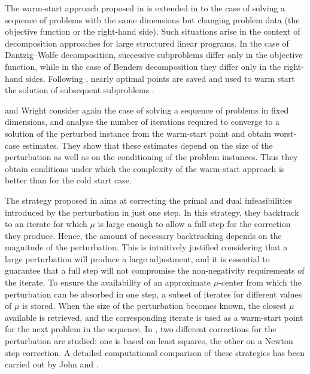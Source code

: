 The warm-start approach proposed in \cite{Gondzio98} is extended
in \cite{GondzioVial} to the case of solving a sequence of problems 
with the same dimensions but changing problem data (the objective 
function or the right-hand side). Such situations arise 
in the context of decomposition approaches for large structured 
linear programs. 
In the case of Dantzig--Wolfe decomposition, successive subproblems 
differ only in the objective function, while in the case 
of Benders decomposition they differ only in the right-hand sides.
Following \cite{Gondzio98}, nearly optimal points are saved and used 
to warm start the solution of subsequent subproblems \cite{GondzioVial}.


\yildirim and Wright \cite{YildirimWright} consider again the case 
of solving a sequence of problems in fixed dimensions, and
analyse the number of iterations required to converge to a 
solution of the perturbed instance from the warm-start point and 
obtain worst-case estimates.
They show that these estimates depend on the size of the perturbation 
as well as on the conditioning %
of the problem 
instances. Thus they obtain conditions under which the complexity 
of the warm-start approach is better than for the cold start case.

The strategy proposed in \cite{YildirimWright} aims at correcting the 
primal and dual infeasibilities introduced by the perturbation in just 
one step.
In this strategy, they backtrack to an iterate for which $\mu$ is 
large enough to allow a full step for the correction they produce. 
Hence, the amount of necessary backtracking depends on the magnitude 
of the perturbation.
This is intuitively justified considering that a large perturbation 
will produce a large adjustment, and it is essential to guarantee that 
a full step will not compromise the non-negativity requirements of the 
iterate.
%
To ensure the availability of an approximate $\mu$-center from which 
the perturbation can be absorbed in one step, a subset of 
iterates for different values of $\mu$ is stored.
When the size of the perturbation becomes known, the closest $\mu$ 
available is retrieved, and the corresponding iterate is used as a 
warm-start point for the next problem in the sequence.
%
In \cite{YildirimWright}, two different corrections for the perturbation
are studied: one is based on least squares, the other on a Newton step 
correction.
A detailed computational comparison of these strategies has been 
carried out by John and \yildirim \cite{JohnYildirim}.

